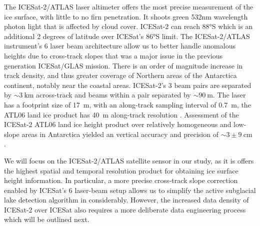 The ICESat-2/ATLAS \citep[2018- ;][]{MarkusIceCloudland2017} laser altimeter offers the most precise measurement of the ice surface, with little to no firn penetration.
It shoots green 532nm wavelength photon light that is affected by cloud cover.
ICESat-2 can reach 88°S which is an additional 2 degrees of latitude over ICESat's 86°S limit.
The ICESat-2/ATLAS instrument's 6 laser beam architecture allow us to better handle anomalous heights due to cross-track slopes that was a major issue in the previous generation ICESat/GLAS mission.
There is an order of magnitude increase in track density, and thus greater coverage of Northern areas of the Antarctica continent, notably near the coastal areas.
ICESat-2's 3 beam pairs are separated by $\sim\SI{3}{\kilo\metre}$ across-track and beams within a pair separated by $\sim\SI{90}{\metre}$.
The laser has a footprint size of \SI{17}{\metre}, with an along-track sampling interval of \SI{0.7}{\metre}, the ATL06 land ice product has \SI{40}{\metre} along-track resolution \citep{SmithLandiceheightretrieval2019}.
Assessment of the ICESat-2 ATL06 land ice height product over relatively homogeneous and low-slope areas in Antarctica yielded an vertical accuracy and precision of $\sim3\pm\SI{9}{\centi\metre}$ \citep{BruntAssessmentICESatIce2019}.



We will focus on the ICESat-2/ATLAS satellite sensor in our study, as it is offers the highest spatial and temporal resolution product for obtaining ice surface height information.
In particular, a more precise cross-track slope correction enabled by ICESat's 6 laser-beam setup allows us to simplify the active subglacial lake detection algorithm in \citet{Smithinventoryactivesubglacial2009} considerably.
However, the increased data density of ICESat-2 over ICESat also requires a more deliberate data engineering process which will be outlined next.




